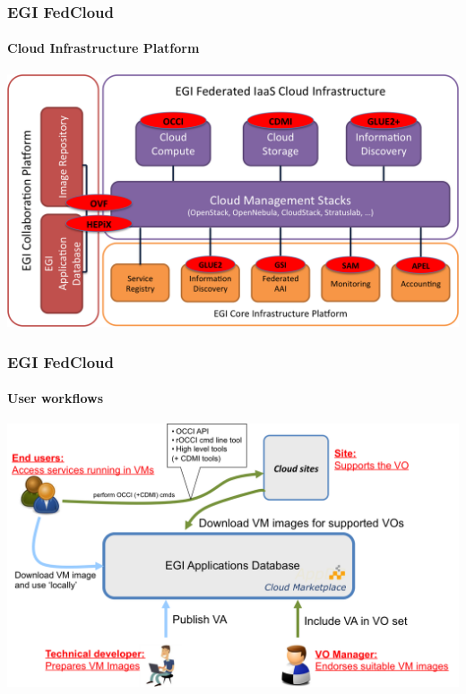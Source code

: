 \begin{frame}
  \frametitle{EGI FedCloud}
  \framesubtitle{Cloud Infrastructure Platform}

  \includegraphics[width=\textwidth]{images/fedcloud_diagram}
\end{frame}

\begin{frame}
  \frametitle{EGI FedCloud}
  \framesubtitle{User workflows}

  \includegraphics[width=\textwidth]{images/fedcloud_workflow}
\end{frame}


